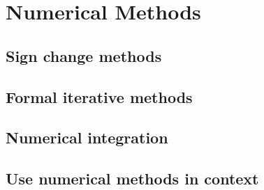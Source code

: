 \chapter{Numerical Methods}
\section{Sign change methods}
\section{Formal iterative methods}
\section{Numerical integration}
\section{Use numerical methods in context}